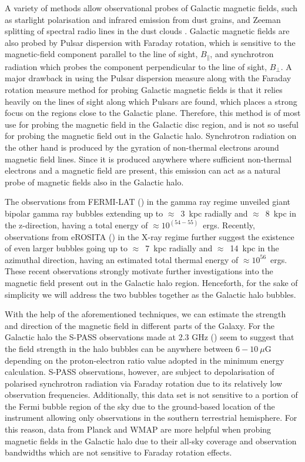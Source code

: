 \documentclass[usenatbib]{mnras}
\begin{document}
A variety of methods allow observational probes of Galactic magnetic fields, such as starlight polarisation and infrared emission from dust grains, and Zeeman splitting of spectral radio lines in the dust clouds \citep{Beck_2007}. Galactic magnetic fields are also probed by Pulsar dispersion with Faraday rotation, which is sensitive to the magnetic-field component parallel to the line of sight, $B_{\parallel}$, and synchrotron radiation which probes the component perpendicular to the line of sight, $B_{\perp}$. A major drawback in using the Pulsar dispersion measure along with the Faraday rotation measure method for probing Galactic magnetic fields is that it relies heavily on the lines of sight along which Pulsars are found, which places a strong focus on the regions close to the Galactic plane. Therefore, this method is of most use for probing the magnetic field in the Galactic disc region, and is not so useful for probing the magnetic field out in the Galactic halo. Synchrotron radiation on the other hand is produced by the gyration of non-thermal electrons around magnetic field lines. Since it is produced anywhere where sufficient non-thermal electrons and a magnetic field are present, this emission can act as a natural probe of magnetic fields also in the Galactic halo.

The observations from FERMI-LAT (\cite{Dobler_2010, Su_2010, Su_2012}) in the gamma ray regime unveiled giant bipolar gamma ray bubbles extending up to $\approx$~3~kpc radially and $\approx$~8~kpc in the z-direction, having a total energy of $\approx 10^{(54-55)}$~ergs. Recently, observations from eROSITA (\cite{eROSITA}) in the X-ray regime further suggest the existence of even larger bubbles going up to  $\approx$~7~kpc radially and $\approx$~14~kpc in the azimuthal direction, having an estimated total thermal energy of $\approx 10^{56}$~ergs. These recent observations strongly motivate further investigations into the magnetic field present out in the Galactic halo region. Henceforth, for the sake of simplicity we will address the two bubbles together as the Galactic halo bubbles.

With the help of the aforementioned techniques, we can estimate the strength and direction of the magnetic field in different parts of the Galaxy. 
For the Galactic halo the S-PASS observations made at 2.3 GHz (\cite{Carretti_2013}) seem to suggest that the field strength in the halo bubbles can be anywhere between $6-10~\mu $G depending on the proton-electron ratio value adopted in the minimum energy calculation. S-PASS observations, however, are subject to depolarisation of polarised synchrotron radiation via Faraday rotation due to its relatively low observation frequencies. Additionally, this data set is not sensitive to a portion of the Fermi bubble region of the sky due to the ground-based location of the instrument allowing only observations in the southern terrestrial hemisphere. For this reason, data from Planck and WMAP are more helpful when probing magnetic fields in the Galactic halo due to their all-sky coverage and observation bandwidths which are not sensitive to Faraday rotation effects.
\end{document}
